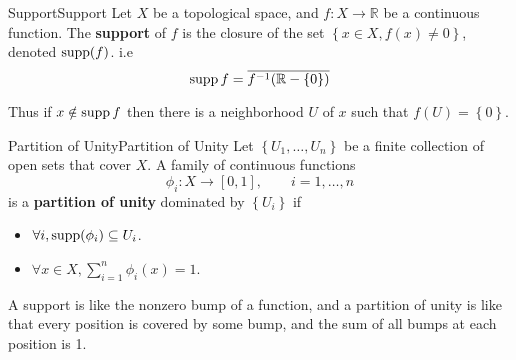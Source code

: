 \documentclass[../main.tex]{subfiles}
\begin{document}
\begin{theorem}{Support}{Support}
	Let $X$ be a topological space, and $f:X \rightarrow \mathbb{R}$ be a continuous function. The \textbf{support} of $f$ is the closure of the set $\left\{ x\in X, f(x)\neq 0 \right\}$, denoted $\operatorname{supp} (f)$. i.e
	\begin{equation}
		\operatorname{supp} f = \overline{f^{-1}(\mathbb{R}-\left\{ 0 \right\})}
	\end{equation}
\end{theorem}
Thus if $x\notin \operatorname{supp} f$ then there is a neighborhood $U$ of $x$ such that $f(U) = \left\{ 0 \right\}$.

\begin{definition}{Partition of Unity}{Partition of Unity}
	Let $\left\{ U_1, \ldots ,U_n \right\}$ be a finite collection of open sets that cover $X$. A family of continuous functions
	\begin{equation}
		\phi_i: X \rightarrow [0,1], \qquad i=1, \ldots ,n
	\end{equation}
	is a \textbf{partition of unity} dominated by $\left\{ U_i \right\}$ if
	\begin{itemize}
		\item $\forall i, \operatorname{supp}(\phi_i) \subseteq U_i$.
		\item $\forall x\in X, \sum_{i=1}^{n} \phi_i(x) = 1$.
	\end{itemize}
\end{definition}

\begin{remark}
	A support is like the nonzero bump of a function, and a partition of unity is like that every position is covered by some bump, and the sum of all bumps at each position is 1.
\end{remark}
\end{document}

